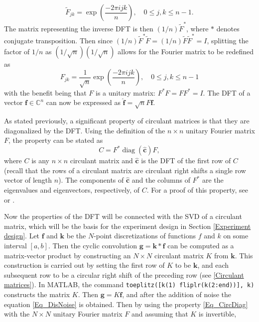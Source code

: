 \documentclass[12pt]{article}
\newcommand{\kcon}{k}
\newcommand{\fcon}{f}
\newcommand{\gdis}{\mathbf{g}}
\newcommand{\kdis}{\mathbf{k}}
\newcommand{\kmat}{K}	%
\newcommand{\fdis}{\mathbf{f}}
\newcommand{\ctrans}{*}	%
\newcommand{\diag}{\operatorname{diag}}
\begin{document}
\[\widetilde{F}_{jk} = \exp\left(\frac{-2\pi{ijk}}{n}\right), \quad 0 \leq j,k \leq n-1.\] 
The matrix representing the inverse DFT is then $(1/n)\widetilde{F}^\ctrans$, where $\ctrans$ denotes conjugate transposition. Then since $(1/n)\widetilde{F}^\ctrans\widetilde{F} = (1/n)\widetilde{F}\widetilde{F}^\ctrans = I$, splitting the factor of $1/n$ as $(1/\sqrt{n})(1/\sqrt{n})$ allows for the Fourier matrix to be redefined as
\begin{equation}
F_{jk} = \frac{1}{\sqrt{n}}\exp\left(\frac{-2\pi{ijk}}{n}\right), \quad 0 \leq j,k \leq n-1
\label{Eq_DFT-Matrix}
\end{equation}
with the benefit being that $F$ is a unitary matrix: $F^\ctrans{F} = FF^\ctrans = I$. The DFT of a vector $\mathbf{f}\in\mathbb{C}^n$ can now be expressed as $\widehat{\mathbf{f}} = \sqrt{n}F\mathbf{f}$. \par 
As stated previously, a significant property of circulant matrices is that they are diagonalized by the DFT. Using the definition of the $n \times n$ unitary Fourier matrix $F$, the property can be stated as
\begin{equation}
C = F^\ctrans\diag(\widehat{\mathbf{c}})F,
\label{Eq_CircDiag}
\end{equation}
where $C$ is any $n \times n$ circulant matrix and $\widehat{\mathbf{c}}$ is the DFT of the first row of $C$ (recall that the rows of a circulant matrix are circulant right shifts a single row vector of length $n$). The components of $\widehat{\mathbf{c}}$ and the columns of $F^\ctrans$ are the eigenvalues and eigenvectors, respectively, of $C$. For a proof of this property, see \cite{BoggessAlbert2001Afci} or \cite{Vogel:2002}. \par
Now the properties of the DFT will be connected with the SVD of a circulant matrix, which will be the basis for the experiment design in Section \ref{Experiment design}. Let $\fdis$ and $\kdis$ be the $N$-point discretizations of functions $\fcon$ and $\kcon$ on some interval $[a,b]$. Then the cyclic convolution $\gdis = \kdis * \fdis$ can be computed as a matrix-vector product by constructing an $N \times N$ circulant matrix $\kmat$ from $\kdis$. This construction is carried out by setting the first row of $\kmat$ to be $\kdis$, and each subsequent row to be a circular right shift of the preceding row (see \ref{Circulant matrices}). In MATLAB, the command \texttt{toeplitz([k(1) fliplr(k(2:end))], k)} constructs the matrix $\kmat$. Then $\gdis = \kmat\fdis$, and after the addition of noise the equation \eqref{Eq_DisNoise} is obtained. Then by using the property \eqref{Eq_CircDiag} with the $N \times N$ unitary Fourier matrix $F$ and assuming that $\kmat$ is invertible, 
\end{document}
